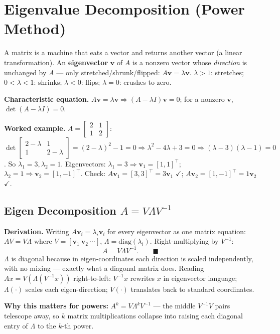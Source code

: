 \section{Eigenvalue Decomposition (Power Method)}

\begin{defbox}
A matrix is a machine that eats a vector and returns another vector (a linear transformation). An \textbf{eigenvector} $\mathbf v$ of $A$ is a nonzero vector whose \emph{direction} is unchanged by $A$ — only stretched/shrunk/flipped: $A\mathbf v=\lambda\mathbf v$. $\lambda>1$: stretches; $0<\lambda<1$: shrinks; $\lambda<0$: flips; $\lambda=0$: crushes to zero.
\end{defbox}

\textbf{Characteristic equation.} $A\mathbf v=\lambda\mathbf v \Rightarrow (A-\lambda I)\mathbf v=0$; for a nonzero $\mathbf v$, $\det(A-\lambda I)=0$.

\begin{examplebox}
\textbf{Worked example.} $A=\begin{bmatrix}2&1\\1&2\end{bmatrix}$: $\det\begin{bmatrix}2-\lambda&1\\1&2-\lambda\end{bmatrix}=(2-\lambda)^2-1=0 \Rightarrow \lambda^2-4\lambda+3=0\Rightarrow(\lambda-3)(\lambda-1)=0$. So $\lambda_1=3,\lambda_2=1$. Eigenvectors: $\lambda_1=3\Rightarrow \mathbf v_1=[1,1]^\top$; $\lambda_2=1\Rightarrow\mathbf v_2=[1,-1]^\top$. Check: $A\mathbf v_1=[3,3]^\top=3\mathbf v_1$ $\checkmark$; $A\mathbf v_2=[1,-1]^\top=1\mathbf v_2$ $\checkmark$.
\end{examplebox}

\subsection{Eigen Decomposition $A=V\Lambda V^{-1}$}

\begin{examplebox}
\textbf{Derivation.} Writing $A\mathbf v_i=\lambda_i\mathbf v_i$ for every eigenvector as one matrix equation: $AV=V\Lambda$ where $V=[\mathbf v_1\ \mathbf v_2\ \cdots]$, $\Lambda=\mathrm{diag}(\lambda_i)$. Right-multiplying by $V^{-1}$:
\[
A = V\Lambda V^{-1}. \qquad\blacksquare
\]
$\Lambda$ is diagonal because in eigen-coordinates each direction is scaled independently, with no mixing — exactly what a diagonal matrix does. Reading $Ax=V(\Lambda(V^{-1}x))$ right-to-left: $V^{-1}x$ rewrites $x$ in eigenvector language; $\Lambda(\cdot)$ scales each eigen-direction; $V(\cdot)$ translates back to standard coordinates.

\textbf{Why this matters for powers:} $A^k=V\Lambda^kV^{-1}$ — the middle $V^{-1}V$ pairs telescope away, so $k$ matrix multiplications collapse into raising each diagonal entry of $\Lambda$ to the $k$-th power.
\end{examplebox}

